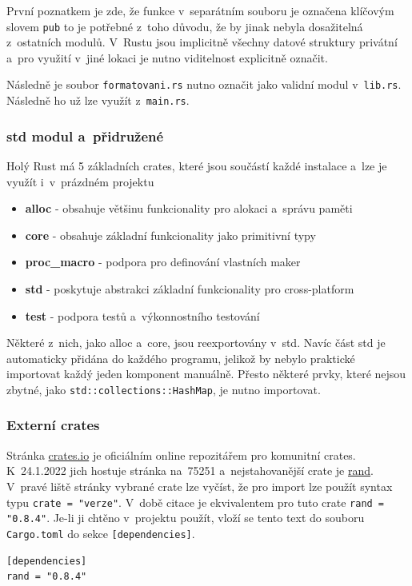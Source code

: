\documentclass[a4paper, 12pt, twoside]{article} %
\newcommand{\rust}[1]{\texttt{#1}}
\begin{document}
		První poznatkem je zde, že funkce v~separátním souboru je označena klíčovým slovem \texttt{pub} to je potřebné z~toho důvodu, že by jinak nebyla dosažitelná z~ostatních modulů. V~Rustu jsou implicitně všechny datové struktury privátní a~pro využití v~jiné lokaci je nutno viditelnost explicitně označit.
		
		Následně je soubor \texttt{formatovani.rs} nutno označit jako validní modul v~\texttt{lib.rs}. Následně ho už lze využít z~\texttt{main.rs}.
		
		\subsubsection*{std modul a~přidružené}
			Holý Rust má 5 základních crates, které jsou součástí každé instalace a~lze je využít i~v~prázdném projektu
			\begin{itemize}
				\item \textbf{alloc} - obsahuje většinu funkcionality pro alokaci a~správu paměti
				\item \textbf{core} - obsahuje základní funkcionality jako primitivní typy
				\item \textbf{proc\_macro} - podpora pro definování vlastních maker
				\item \textbf{std} - poskytuje abstrakci základní funkcionality pro cross-platform
				\item \textbf{test} - podpora testů a~výkonnostního testování
			\end{itemize}

			Některé z~nich, jako alloc a~core, jsou reexportovány v~std. Navíc část std je automaticky přidána do každého programu, jelikož by nebylo praktické importovat každý jeden komponent manuálně. Přesto některé prvky, které nejsou zbytné, jako \rust{std::collections::HashMap}, je nutno importovat.

		\subsubsection*{Externí crates}
			Stránka \href{https://crates.io/}{crates.io} je oficiálním online repozitářem pro komunitní crates. K~24.1.2022 jich hostuje stránka na~75251 a~nejstahovanější crate je \href{https://crates.io/crates/rand}{rand}. V~pravé liště stránky vybrané crate lze vyčíst, že pro import lze použít syntax typu \texttt{crate = "verze"}. V~době citace je ekvivalentem pro tuto crate \texttt{rand = "0.8.4"}. Je-li ji chtěno v~projektu použít, vloží se tento text do souboru \texttt{Cargo.toml} do sekce \texttt{[dependencies]}.
			\begin{verbatim}
[dependencies]
rand = "0.8.4"
			\end{verbatim}
		
\end{document}

